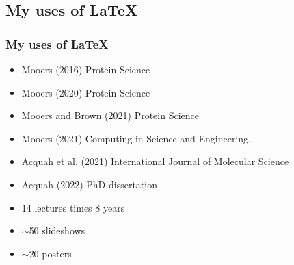 \documentclass{beamer}
\begin{document}
\subsection{My uses of \LaTeX}
\begin{frame}
\frametitle{My uses of \LaTeX }
\begin{center}
\begin{Large}
\begin{itemize}[font=$\bullet$\scshape\bfseries]
\item Mooers (2016) Protein Science
\item Mooers (2020) Protein Science
\item Mooers and Brown (2021) Protein Science
\item Mooers (2021) Computing in Science and Engineering.
\item Acquah et al. (2021) International Journal of Molecular Science
\item Acquah (2022) PhD dissertation
\item 14 lectures times 8 years
\item $\sim$50 slideshows
\item $\sim$20 posters
\end{itemize}
\end{Large}
\end{center}
\end{frame}


\end{document}
